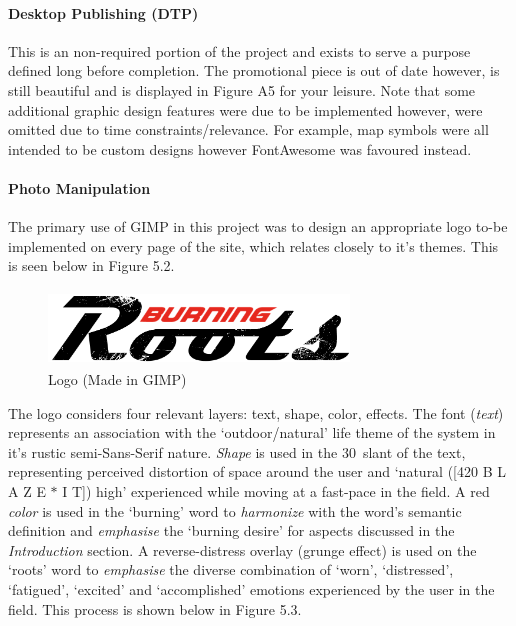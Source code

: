 \documentclass[11pt, english]{article}
\begin{document}
			\paragraph{Desktop Publishing (DTP)}

	This is an non-required portion of the project and exists to serve a purpose defined long before completion. The promotional piece is out of date however, is still beautiful and is displayed in Figure A5 for your leisure. Note that some additional graphic design features were due to be implemented however, were omitted due to time constraints/relevance. For example, map symbols were all intended to be custom designs however FontAwesome was favoured instead.

			\paragraph{Photo Manipulation}

	The primary use of GIMP in this project was to design an appropriate logo to-be implemented on every page of the site, which relates closely to it's themes. This is seen below in Figure 5.2.

	\begin{figure}[H]
	\begin{center}
		\includegraphics[width=8cm,height=2cm]{../System/Photos/Logo.png}
		\caption{Logo (Made in GIMP)}
	\end{center}
	\end{figure}

\newpage

	The logo considers four relevant layers: text, shape, color, effects. The font (\textit{text}) represents an association with the `outdoor/natural' life theme of the system in it's rustic semi-Sans-Serif nature. \textit{Shape} is used in the 30\textdegree\ slant of the text, representing perceived distortion of space around the user and `natural ([420 B L A Z E $\ast$ I T]) high' experienced while moving at a fast-pace in the field. A red \textit{color} is used in the `burning' word to \textit{harmonize} with the word's semantic definition and \textit{emphasise} the `burning desire' for aspects discussed in the \textit{Introduction} section. A reverse-distress overlay (grunge effect) is used on the `roots' word to \textit{emphasise} the diverse combination of `worn', `distressed', `fatigued', `excited' and `accomplished' emotions experienced by the user in the field. This process is shown below in Figure 5.3.
\end{document}
